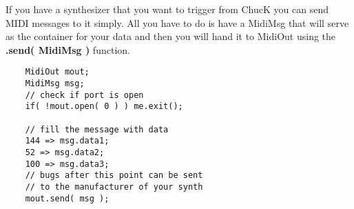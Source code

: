 If you have a synthesizer that you want to trigger from ChucK you can send MIDI messages to it simply. All you have to do is have a MidiMsg that will serve as the container for your data and then you will hand it to MidiOut using the {\bf .send( MidiMsg )} function.

\begin{verbatim}
    MidiOut mout;
    MidiMsg msg;
    // check if port is open 
    if( !mout.open( 0 ) ) me.exit();

    // fill the message with data
    144 => msg.data1;
    52 => msg.data2;
    100 => msg.data3;
    // bugs after this point can be sent
    // to the manufacturer of your synth
    mout.send( msg );
\end{verbatim}